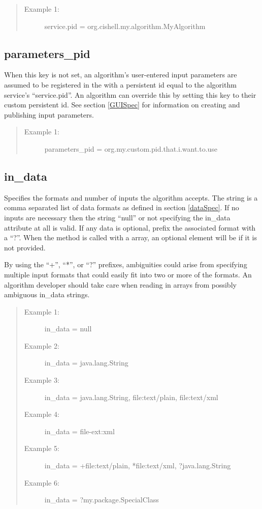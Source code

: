 \begin{quote}
\begin{description}
  \item[Example 1:] service.pid = org.cishell.my.algorithm.MyAlgorithm
\end{description}
\end{quote}


\subsection*{parameters\_pid} 

When this key is not set, an algorithm's user-entered input parameters are
assumed to be registered in the  with a persistent id
equal to the algorithm service's ``service.pid''. An algorithm can override this
by setting this key to their custom persistent id. See section \ref{GUISpec}
for information on creating and publishing input parameters.

\begin{quote}
\begin{description}
  \item[Example 1:] parameters\_pid = org.my.custom.pid.that.i.want.to.use
\end{description}
\end{quote}


\subsection*{in\_data} 
Specifies the formats and number of  inputs the
algorithm accepts. The string is a comma separated list of data formats as
defined in section \ref{dataSpec}. If no  inputs are necessary then
the string ``null'' or not specifying the in\_data attribute at all is valid.
If any data is optional, prefix the associated format with a ``?''. When the
 method is called with a 
array, an optional  element will be  if it is not
provided.

By using the ``+'', ``*'', or ``?'' prefixes, ambiguities could arise from
specifying multiple input formats that could easily fit into two or more
of the formats. An algorithm developer should take care when reading
in  arrays from possibly ambiguous in\_data strings.

\begin{quote}
\begin{description}
  \item[Example 1:] in\_data = null
  \item[Example 2:] in\_data = java.lang.String
  \item[Example 3:] in\_data = java.lang.String, file:text/plain, file:text/xml
  \item[Example 4:] in\_data = file-ext:xml
  \item[Example 5:] in\_data = +file:text/plain, *file:text/xml,
  ?java.lang.String
  \item[Example 6:] in\_data = ?my.package.SpecialClass
\end{description}
\end{quote}


